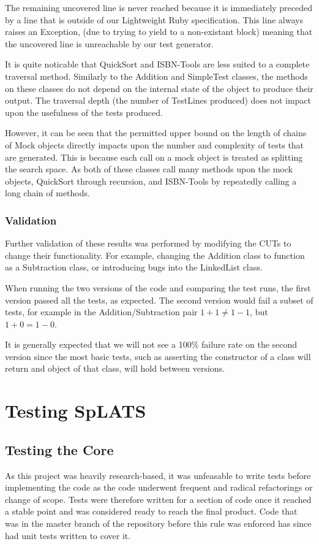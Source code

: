   The remaining uncovered line is never reached because it is immediately preceded by a line that is outside of our Lightweight Ruby specification.
This line always raises an Exception, (due to trying to yield to a non-existant block) meaning that the uncovered line is unreachable by our test generator.

  It is quite noticable that QuickSort and ISBN-Tools are less suited to a complete traversal method.
Similarly to the Addition and SimpleTest classes, the methods on these classes do not depend on the internal state of the object to produce their output.
The traversal depth (the number of TestLines produced) does not impact upon the usefulness of the tests produced.

  However, it can be seen that the permitted upper bound on the length of chains of Mock objects directly impacts upon the number and complexity of tests that are generated.
This is because each call on a mock object is treated as splitting the search space.
As both of these classes call many methods upon the mock objects, QuickSort through recursion, and ISBN-Tools by repeatedly calling a long chain of methods.

\subsubsection{Validation}
  Further validation of these results was performed by modifying the CUTs to
change their functionality.
For example, changing the Addition class to function as a Subtraction class, or
introducing bugs into the LinkedList class.

When running the two versions of the code and comparing the test runs, the first
version passed all the tests, as expected. The second version would fail a
subset of tests, for example in the Addition/Subtraction pair $1 + 1 \neq 1 -
1$, but $1 + 0 = 1 - 0$.

It is generally expected that we will not see a 100\% failure rate on the second version since the most basic tests, such as asserting the constructor of a class will return and object of that class, will hold between versions.

\section{Testing SpLATS}
\subsection{Testing the Core}
  As this project was heavily research-based, it was unfeasable to write tests before implementing the code as the code underwent frequent and radical refactorings or change of scope.
  Tests were therefore written for a section of code once it reached a stable point and was considered ready to reach the final product.
  Code that was in the master branch of the repository before this rule was enforced has since had unit tests written to cover it.
    

